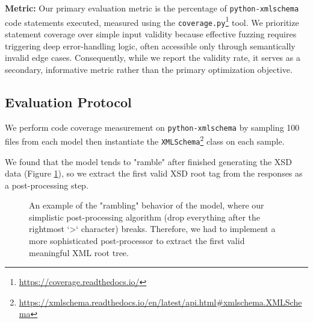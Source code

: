 \documentclass[11pt]{article}
\begin{document}
\textbf{Metric:} Our primary evaluation metric is the percentage of \texttt{python-xmlschema} code statements executed, measured using the \texttt{coverage.py}\footnote{\url{https://coverage.readthedocs.io/}} tool. We prioritize statement coverage over simple input validity because effective fuzzing requires triggering deep error-handling logic, often accessible only through semantically invalid edge cases. Consequently, while we report the validity rate, it serves as a secondary, informative metric rather than the primary optimization objective.

\subsection{Evaluation Protocol}

We perform code coverage measurement on \texttt{python-xmlschema} by sampling 100 files from each model then instantiate the \texttt{XMLSchema}\footnote{\url{https://xmlschema.readthedocs.io/en/latest/api.html\#xmlschema.XMLSchema}} class on each sample.

We found that the model tends to "ramble" after finished generating the XSD data (Figure \ref{fig:ramble}), so we extract the first valid XSD root tag from the responses as a post-processing step.

\begin{figure}[h!]
\centering
{}
\caption{An example of the "rambling" behavior of the model, where our simplistic post-processing algorithm (drop everything after the rightmost `>` character) breaks. Therefore, we had to implement a more sophisticated post-processor to extract the first valid meaningful XML root tree.}
\label{fig:ramble}
\end{figure}
\end{document}
